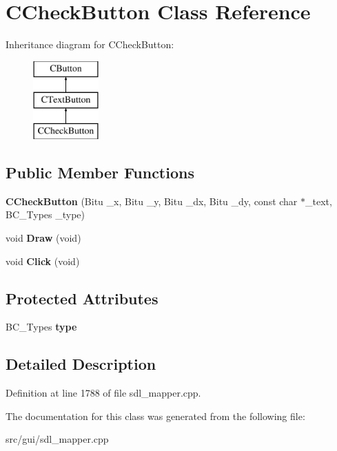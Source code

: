 \hypertarget{classCCheckButton}{\section{C\-Check\-Button Class Reference}
\label{classCCheckButton}
}
Inheritance diagram for C\-Check\-Button\-:\begin{figure}[H]
\begin{center}
\leavevmode
\includegraphics[height=3.000000cm]{classCCheckButton}
\end{center}
\end{figure}
\subsection*{Public Member Functions}
\begin{DoxyCompactItemize}
\item 
\hypertarget{classCCheckButton_a54c679603fea5cb3e04277f6099d2067}{{\bfseries C\-Check\-Button} (Bitu \-\_\-x, Bitu \-\_\-y, Bitu \-\_\-dx, Bitu \-\_\-dy, const char $\ast$\-\_\-text, B\-C\-\_\-\-Types \-\_\-type)}\label{classCCheckButton_a54c679603fea5cb3e04277f6099d2067}

\item 
\hypertarget{classCCheckButton_a1893209408d4822886cd6e39aab69db4}{void {\bfseries Draw} (void)}\label{classCCheckButton_a1893209408d4822886cd6e39aab69db4}

\item 
\hypertarget{classCCheckButton_a5d3d194c8eedc74fbb7862165737833e}{void {\bfseries Click} (void)}\label{classCCheckButton_a5d3d194c8eedc74fbb7862165737833e}

\end{DoxyCompactItemize}
\subsection*{Protected Attributes}
\begin{DoxyCompactItemize}
\item 
\hypertarget{classCCheckButton_a5351f20571c7ed787def47ae73a1820f}{B\-C\-\_\-\-Types {\bfseries type}}\label{classCCheckButton_a5351f20571c7ed787def47ae73a1820f}

\end{DoxyCompactItemize}


\subsection{Detailed Description}


Definition at line 1788 of file sdl\-\_\-mapper.\-cpp.



The documentation for this class was generated from the following file\-:\begin{DoxyCompactItemize}
\item 
src/gui/sdl\-\_\-mapper.\-cpp\end{DoxyCompactItemize}
